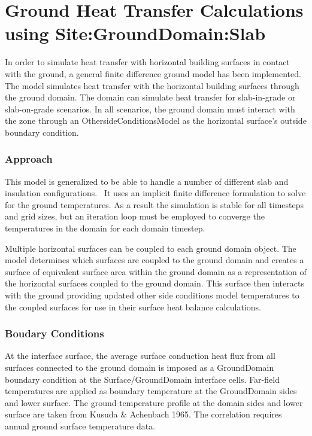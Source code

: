 \section{Ground Heat Transfer Calculations using Site:GroundDomain:Slab}\label{ground-heat-transfer-calculations-using-sitegrounddomainslab}

In order to simulate heat transfer with horizontal building surfaces in contact with the ground, a general finite difference ground model has been implemented. The model simulates heat transfer with the horizontal building surfaces through the ground domain. The domain can simulate heat transfer for slab-in-grade or slab-on-grade scenarios. In all scenarios, the ground domain must interact with the zone through an OthersideConditionsModel as the horizontal surface's outside boundary condition.

\subsubsection{Approach}\label{approach-001}

This model is generalized to be able to handle a number of different slab and insulation configurations.~ It uses an implicit finite difference formulation to solve for the ground temperatures. As a result the simulation is stable for all timesteps and grid sizes, but an iteration loop must be employed to converge the temperatures in the domain for each domain timestep.

Multiple horizontal surfaces can be coupled to each ground domain object. The model determines which surfaces are coupled to the ground domain and creates a surface of equivalent surface area within the ground domain as a representation of the horizontal surfaces coupled to the ground domain. This surface then interacts with the ground providing updated other side conditions model temperatures to the coupled surfaces for use in their surface heat balance calculations.

\subsubsection{Boudary Conditions}\label{boudary-conditions}

At the interface surface, the average surface conduction heat flux from all surfaces connected to the ground domain is imposed as a GroundDomain boundary condition at the Surface/GroundDomain interface cells. Far-field temperatures are applied as boundary temperature at the GroundDomain sides and lower surface. The ground temperature profile at the domain sides and lower surface are taken from Kusuda \& Achenbach 1965. The correlation requires annual ground surface temperature data.

